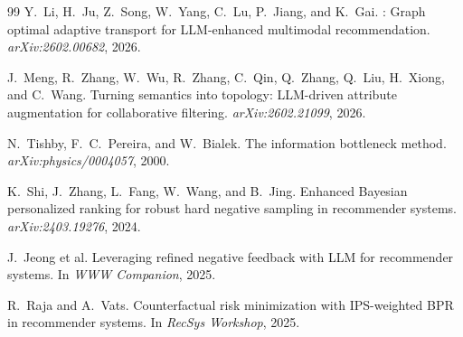 \documentclass[11pt,a4paper]{article}
\begin{document}
\begin{thebibliography}{99}
Y.~Li, H.~Ju, Z.~Song, W.~Yang, C.~Lu, P.~Jiang, and K.~Gai.
: Graph optimal adaptive transport for {LLM}-enhanced multimodal recommendation.
\newblock \emph{arXiv:2602.00682}, 2026.

J.~Meng, R.~Zhang, W.~Wu, R.~Zhang, C.~Qin, Q.~Zhang, Q.~Liu, H.~Xiong, and C.~Wang.
\newblock Turning semantics into topology: {LLM}-driven attribute augmentation for collaborative filtering.
\newblock \emph{arXiv:2602.21099}, 2026.

N.~Tishby, F.~C.~Pereira, and W.~Bialek.
\newblock The information bottleneck method.
\newblock \emph{arXiv:physics/0004057}, 2000.

K.~Shi, J.~Zhang, L.~Fang, W.~Wang, and B.~Jing.
\newblock Enhanced {B}ayesian personalized ranking for robust hard negative sampling in recommender systems.
\newblock \emph{arXiv:2403.19276}, 2024.

J.~Jeong et al.
\newblock Leveraging refined negative feedback with {LLM} for recommender systems.
\newblock In \emph{WWW Companion}, 2025.

R.~Raja and A.~Vats.
\newblock Counterfactual risk minimization with {IPS}-weighted {BPR} in recommender systems.
\newblock In \emph{RecSys Workshop}, 2025.

\end{thebibliography}
\end{document}
